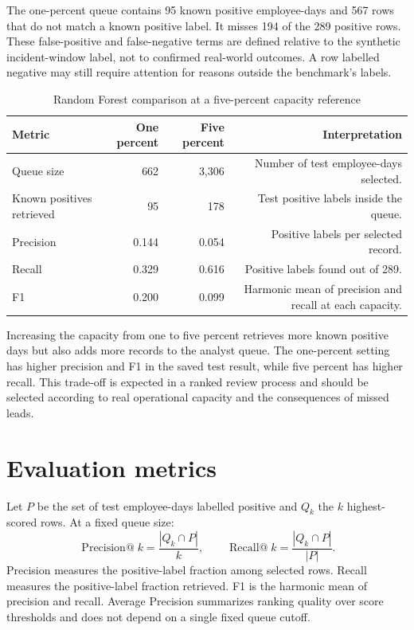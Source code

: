 \documentclass[12pt,a4paper,oneside]{report}
\newcommand{\tablefont}{\small}
\begin{document}
The one-percent queue contains 95 known positive employee-days and 567
rows that do not match a known positive label. It misses 194 of the
289 positive rows. These false-positive and false-negative terms are
defined relative to the synthetic incident-window label, not to
confirmed real-world outcomes. A row labelled negative may still
require attention for reasons outside the benchmark's labels.

\begin{table}[H]
\centering
\tablefont
\caption{Random Forest comparison at a five-percent capacity reference}
\label{tab:five-percent}
\begin{tabularx}{\textwidth}{|p{}|R|R|R|}
\hline
\textbf{Metric} & \textbf{One percent} & \textbf{Five percent} & \textbf{Interpretation}\\\hline
Queue size & 662 & 3,306 & Number of test employee-days selected.\\\hline
Known positives retrieved & 95 & 178 & Test positive labels inside the queue.\\\hline
Precision & 0.144 & 0.054 & Positive labels per selected record.\\\hline
Recall & 0.329 & 0.616 & Positive labels found out of 289.\\\hline
F1 & 0.200 & 0.099 & Harmonic mean of precision and recall at each capacity.\\\hline
\end{tabularx}
\end{table}

Increasing the capacity from one to five percent retrieves more known
positive days but also adds more records to the analyst queue. The
one-percent setting has higher precision and F1 in the saved test
result, while five percent has higher recall. This trade-off is
expected in a ranked review process and should be selected according to
real operational capacity and the consequences of missed leads.

\section{Evaluation metrics}
Let \(P\) be the set of test employee-days labelled positive and
\(Q_k\) the \(k\) highest-scored rows. At a fixed queue size:
\[
\operatorname{Precision@}k = \frac{|Q_k\cap P|}{k},
\qquad
\operatorname{Recall@}k = \frac{|Q_k\cap P|}{|P|}.
\]
Precision measures the positive-label fraction among selected rows.
Recall measures the positive-label fraction retrieved. F1 is the
harmonic mean of precision and recall. Average Precision summarizes
ranking quality over score thresholds and does not depend on a single
fixed queue cutoff.
\end{document}

